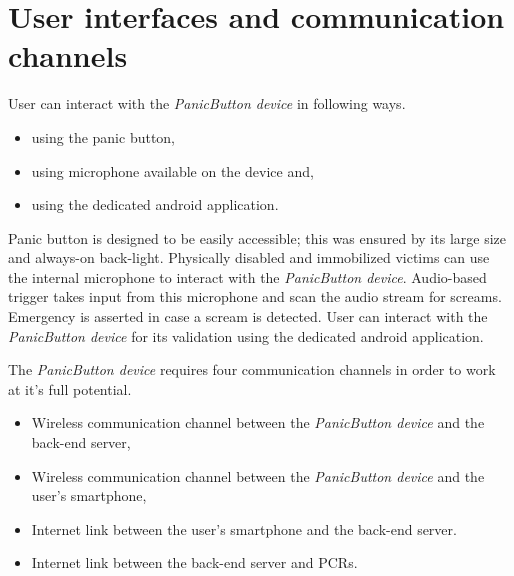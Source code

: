 
\section{User interfaces and communication channels}
User can interact with the \emph{PanicButton device} in following ways.
\begin{itemize}
\item using the panic button,
\item using microphone available on the device and,
\item using the dedicated android application.
\end{itemize}
Panic button is designed to be easily accessible; this was ensured by its large size and always-on back-light. Physically disabled and immobilized victims can use the internal microphone to interact with the \emph{PanicButton device}. Audio-based trigger takes input from this microphone and scan the audio stream for screams. Emergency is asserted in case a scream is detected. User can interact with the \emph{PanicButton device} for its validation using the dedicated android application.

The \emph{PanicButton device} requires four communication channels in order to work at it's full potential.
\begin{itemize}
\item Wireless communication channel between the \emph{PanicButton device} and the back-end server,
\item Wireless communication channel between the \emph{PanicButton device} and the user's smartphone,
\item Internet link between the user's smartphone and the back-end server.
\item Internet link between the back-end server and PCRs.
\end{itemize}

